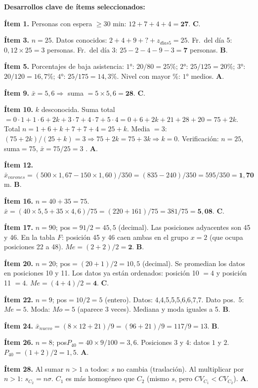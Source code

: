 \documentclass[11pt, letterpaper]{article}
\begin{document}
\medskip
\textbf{Desarrollos clave de ítems seleccionados:}

\medskip
\textbf{Ítem 1.} Personas con espera $\geq30$ min: $12+7+4+4=\mathbf{27}$. \textbf{C}.

\textbf{Ítem 3.} $n=25$. Datos conocidos: $2+4+9+?+z_{días5}=25$. Fr.\ del día 5: $0{,}12\times25=3$ personas. Fr.\ del día 3: $25-2-4-9-3=\mathbf{7}$ personas. \textbf{B}.

\textbf{Ítem 5.} Porcentajes de baja asistencia: $1°$: $20/80=25\%$; $2°$: $25/125=20\%$; $3°$: $20/120=16{,}7\%$; $4°$: $25/175=14{,}3\%$. Nivel con mayor \%: $1°$ medios. \textbf{A}.

\textbf{Ítem 9.} $\bar{x}=5{,}6 \Rightarrow$ suma $=5\times5{,}6=\mathbf{28}$. \textbf{C}.

\textbf{Ítem 10.} $k$ desconocida. Suma total $= 0\cdot1+1\cdot6+2k+3\cdot7+4\cdot7+5\cdot4 = 0+6+2k+21+28+20=75+2k$. Total $n=1+6+k+7+7+4=25+k$. Media $=3$: $(75+2k)/(25+k)=3 \Rightarrow 75+2k=75+3k \Rightarrow k=0$. Verificación: $n=25$, suma$=75$, $\bar{x}=75/25=3$ \checkmark. \textbf{A}.

\textbf{Ítem 12.} $\bar{x}_{varones}=(500\times1{,}67-150\times1{,}60)/350=(835-240)/350=595/350=\mathbf{1{,}70}$ m. \textbf{B}.

\textbf{Ítem 16.} $n=40+35=75$. $\bar{x}=(40\times5{,}5+35\times4{,}6)/75=(220+161)/75=381/75=\mathbf{5{,}08}$. \textbf{C}.

\textbf{Ítem 17.} $n=90$; pos$=91/2=45{,}5$ (decimal). Las posiciones adyacentes son 45 y 46. En la tabla $F$: posición 45 y 46 caen ambas en el grupo $x=2$ (que ocupa posiciones 22 a 48). $Me=(2+2)/2=\mathbf{2}$. \textbf{B}.

\textbf{Ítem 20.} $n=20$; pos$=(20+1)/2=10{,}5$ (decimal). Se promedian los datos en posiciones 10 y 11. Los datos ya están ordenados: posición 10 $=4$ y posición 11 $=4$. $Me=(4+4)/2=\mathbf{4}$. \textbf{C}.

\textbf{Ítem 22.} $n=9$; pos$=10/2=5$ (entero). Datos: 4,4,5,5,5,6,6,7,7. Dato pos.\ 5: $Me=5$. Moda: $Mo=5$ (aparece 3 veces). Mediana y moda iguales a 5. \textbf{B}.

\textbf{Ítem 24.} $\bar{x}_{nuevo}=(8\times12+21)/9=(96+21)/9=117/9=13$. \textbf{B}.

\textbf{Ítem 26.} $n=8$; pos$P_{40}=40\times9/100=3{,}6$. Posiciones 3 y 4: datos $1$ y $2$. $P_{40}=(1+2)/2=1{,}5$. \textbf{A}.

\textbf{Ítem 28.} Al sumar $n>1$ a todos: $s$ no cambia (traslación). Al multiplicar por $n>1$: $s_{C_2}=n\sigma$. $C_1$ es más homogéneo que $C_2$ (mismo $s$, pero $CV_{C_1}<CV_{C_2}$). \textbf{A}.
\end{document}

